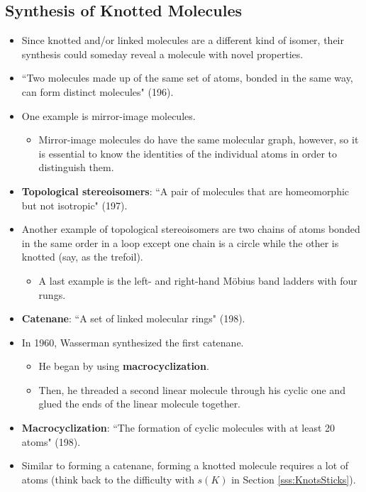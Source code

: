 \documentclass[titlepage]{article}
\numberwithin{figure}{section}
\numberwithin{table}{section}
\numberwithin{equation}{section}
\newcommand{\dq}[2]{``#1" (#2).}
\begin{document}
\subsection{Synthesis of Knotted Molecules}
\begin{itemize}
    \item Since knotted and/or linked molecules are a different kind of isomer, their synthesis could someday reveal a molecule with novel properties.
    \item \dq{Two molecules made up of the same set of atoms, bonded in the same way, can form distinct molecules}{196}
    \item One example is mirror-image molecules.
    \begin{itemize}
        \item Mirror-image molecules do have the same molecular graph, however, so it is essential to know the identities of the individual atoms in order to distinguish them.
    \end{itemize}
    \item \textbf{Topological stereoisomers}: \dq{A pair of molecules that are homeomorphic but not isotropic}{197}
    \item Another example of topological stereoisomers are two chains of atoms bonded in the same order in a loop except one chain is a circle while the other is knotted (say, as the trefoil).
    \begin{itemize}
        \item A last example is the left- and right-hand M\"{o}bius band ladders with four rungs.
    \end{itemize}
    \item \textbf{Catenane}: \dq{A set of linked molecular rings}{198}
    \item In 1960, Wasserman synthesized the first catenane.
    \begin{itemize}
        \item He began by using \textbf{macrocyclization}.
        \item Then, he threaded a second linear molecule through his cyclic one and glued the ends of the linear molecule together.
    \end{itemize}
    \item \textbf{Macrocyclization}: \dq{The formation of cyclic molecules with at least 20 atoms}{198}
    \item Similar to forming a catenane, forming a knotted molecule requires a lot of atoms (think back to the difficulty with $s(K)$ in Section \ref{sss:KnotsSticks}).

\end{itemize}
\end{document}
